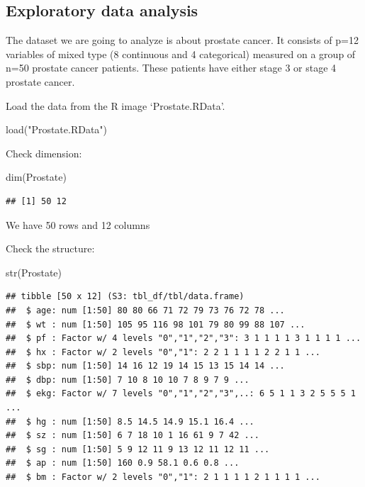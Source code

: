\documentclass[
]{article}
\newenvironment{Shaded}{\begin{snugshade}}{\end{snugshade}}
\newcommand{\FunctionTok}[1]{\textcolor[rgb]{0.00,0.00,0.00}{#1}}
\newcommand{\NormalTok}[1]{#1}
\newcommand{\StringTok}[1]{\textcolor[rgb]{0.31,0.60,0.02}{#1}}
\begin{document}
\hypertarget{exploratory-data-analysis}{%
\subsection{Exploratory data analysis}\label{exploratory-data-analysis}}

The dataset we are going to analyze is about prostate cancer. It
consists of p=12 variables of mixed type (8 continuous and 4
categorical) measured on a group of n=50 prostate cancer patients. These
patients have either stage 3 or stage 4 prostate cancer.

Load the data from the R image `Prostate.RData'.

\begin{Shaded}
\begin{Highlighting}[]
\FunctionTok{load}\NormalTok{(}\StringTok{"Prostate.RData"}\NormalTok{)}
\end{Highlighting}
\end{Shaded}

Check dimension:

\begin{Shaded}
\begin{Highlighting}[]
\FunctionTok{dim}\NormalTok{(Prostate)}
\end{Highlighting}
\end{Shaded}

\begin{verbatim}
## [1] 50 12
\end{verbatim}

We have 50 rows and 12 columns

Check the structure:

\begin{Shaded}
\begin{Highlighting}[]
\FunctionTok{str}\NormalTok{(Prostate)}
\end{Highlighting}
\end{Shaded}

\begin{verbatim}
## tibble [50 x 12] (S3: tbl_df/tbl/data.frame)
##  $ age: num [1:50] 80 80 66 71 72 79 73 76 72 78 ...
##  $ wt : num [1:50] 105 95 116 98 101 79 80 99 88 107 ...
##  $ pf : Factor w/ 4 levels "0","1","2","3": 3 1 1 1 1 3 1 1 1 1 ...
##  $ hx : Factor w/ 2 levels "0","1": 2 2 1 1 1 1 2 2 1 1 ...
##  $ sbp: num [1:50] 14 16 12 19 14 15 13 15 14 14 ...
##  $ dbp: num [1:50] 7 10 8 10 10 7 8 9 7 9 ...
##  $ ekg: Factor w/ 7 levels "0","1","2","3",..: 6 5 1 1 3 2 5 5 5 1 ...
##  $ hg : num [1:50] 8.5 14.5 14.9 15.1 16.4 ...
##  $ sz : num [1:50] 6 7 18 10 1 16 61 9 7 42 ...
##  $ sg : num [1:50] 5 9 12 11 9 13 12 11 12 11 ...
##  $ ap : num [1:50] 160 0.9 58.1 0.6 0.8 ...
##  $ bm : Factor w/ 2 levels "0","1": 2 1 1 1 1 2 1 1 1 1 ...
\end{verbatim}
\end{document}
